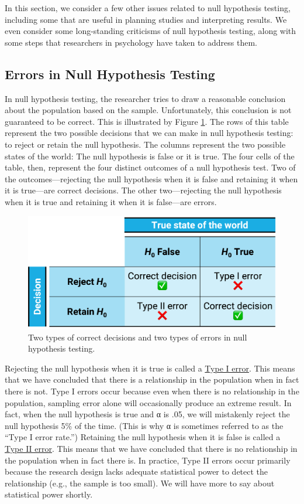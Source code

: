 \documentclass[
]{krantz}
\begin{document}
In this section, we consider a few other issues related to null hypothesis testing, including some that are useful in planning studies and interpreting results. We even consider some long-standing criticisms of null hypothesis testing, along with some steps that researchers in psychology have taken to address them.

\hypertarget{errors-in-null-hypothesis-testing}{%
\subsection*{Errors in Null Hypothesis Testing}\label{errors-in-null-hypothesis-testing}}


In null hypothesis testing, the researcher tries to draw a reasonable conclusion about the population based on the sample. Unfortunately, this conclusion is not guaranteed to be correct. This is illustrated by Figure \ref{fig:errors}. The rows of this table represent the two possible decisions that we can make in null hypothesis testing: to reject or retain the null hypothesis. The columns represent the two possible states of the world: The null hypothesis is false or it is true. The four cells of the table, then, represent the four distinct outcomes of a null hypothesis test. Two of the outcomes---rejecting the null hypothesis when it is false and retaining it when it is true---are correct decisions. The other two---rejecting the null hypothesis when it is true and retaining it when it is false---are errors.

\begin{figure}

{\centering \includegraphics[width=0.5\linewidth]{images/ch13/errors} 

}

\caption{Two types of correct decisions and two types of errors in null hypothesis testing.}\label{fig:errors}
\end{figure}

Rejecting the null hypothesis when it is true is called a \protect\hyperlink{type-i-error}{Type I error}. This means that we have concluded that there is a relationship in the population when in fact there is not. Type I errors occur because even when there is no relationship in the population, sampling error alone will occasionally produce an extreme result. In fact, when the null hypothesis is true and α is .05, we will mistakenly reject the null hypothesis 5\% of the time. (This is why α is sometimes referred to as the ``Type I error rate.'') Retaining the null hypothesis when it is false is called a \protect\hyperlink{type-ii-error}{Type II error}. This means that we have concluded that there is no relationship in the population when in fact there is. In practice, Type II errors occur primarily because the research design lacks adequate statistical power to detect the relationship (e.g., the sample is too small). We will have more to say about statistical power shortly.
\end{document}
